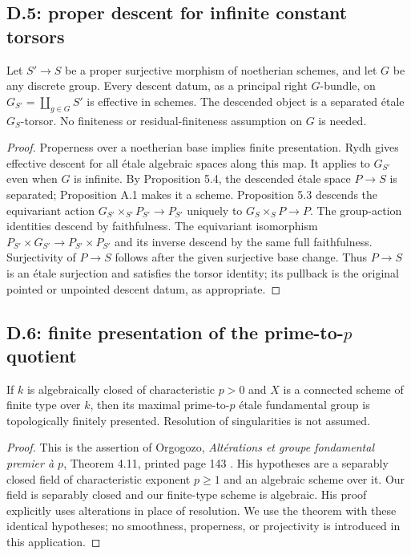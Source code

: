 \subsection{D.5: proper descent for infinite constant torsors}

\begin{proposition}\label{D:proper-descent}
Let $S'\to S$ be a proper surjective morphism of noetherian schemes,
and let $G$ be any discrete group. Every descent datum, as a principal
right $G$-bundle, on $G_{S'}=\coprod_{g\in G}S'$ is effective in
schemes. The descended object is a separated \'etale $G_S$-torsor.
No finiteness or residual-finiteness assumption on $G$ is needed.
\end{proposition}
\begin{proof}
Properness over a noetherian base implies finite presentation.
Rydh \cite[Theorem 5.19(ii)]{Rydh2010} gives effective descent for all
\'etale algebraic spaces along this map. It applies to $G_{S'}$ even
when $G$ is infinite. By Proposition 5.4, the descended \'etale space
$P\to S$ is separated; Proposition A.1 makes it a scheme.
Proposition 5.3 descends the equivariant action
$G_{S'}\times_{S'}P_{S'}\to P_{S'}$ uniquely to
$G_S\times_SP\to P$. The group-action identities descend by
faithfulness. The equivariant isomorphism
$P_{S'}\times G_{S'}\to P_{S'}\times P_{S'}$ and its inverse
descend by the same full faithfulness. Surjectivity of $P\to S$
follows after the given surjective base change. Thus $P\to S$ is
an \'etale surjection and satisfies the torsor identity; its pullback
is the original pointed or unpointed descent datum, as appropriate.
\end{proof}

\subsection{D.6: finite presentation of the prime-to-\texorpdfstring{$p$}{p} quotient}

\begin{proposition}\label{D:prime-to-p}
If $k$ is algebraically closed of characteristic $p>0$ and $X$ is a
connected scheme of finite type over $k$, then its maximal prime-to-$p$
\'etale fundamental group is topologically finitely presented.
Resolution of singularities is not assumed.
\end{proposition}
\begin{proof}
This is the assertion of Orgogozo,
\emph{Alt\'erations et groupe fondamental premier \`a $p$},
Theorem 4.11, printed page 143 \cite{Orgogozo2003}.
His hypotheses are a separably closed field of characteristic exponent
$p\geq1$ and an algebraic scheme over it. Our field is separably
closed and our finite-type scheme is algebraic. His proof explicitly
uses alterations in place of resolution. We use the theorem with
these identical hypotheses; no smoothness, properness, or projectivity
is introduced in this application.
\end{proof}

